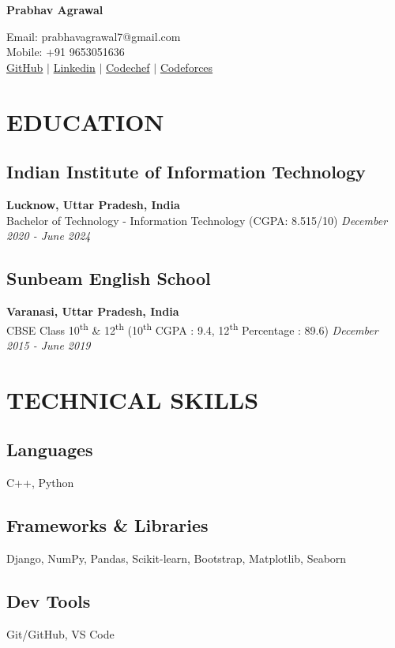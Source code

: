\documentclass[12pt]{article}
\newcommand{\resumename}[1]{\LARGE\textbf{#1} \hfill \small}
\begin{document}
\noindent
\resumename{Prabhav Agrawal} \raggedright Email: prabhavagrawal7@gmail.com \\
\hfill Mobile: +91 9653051636 \\
\href{https://github.com/prabhavagrawal7}{GitHub} $\vert$
\href{https://www.linkedin.com/in/prabhavagrawal7/}{Linkedin} $\vert$
\href{https://www.codechef.com/users/prabhav7}{Codechef} $\vert$
\href{https://codeforces.com/profile/prabhavagrawal7}{Codeforces} 
\section*{EDUCATION}
\subsection*{Indian Institute of Information Technology}      \hfill \textbf{Lucknow, Uttar Pradesh, India} \\
Bachelor of Technology - Information Technology (CGPA: 8.515/10) \hfill \textit{December 2020 - June 2024} \\
\subsection*{Sunbeam English School}                       \hfill \textbf{Varanasi, Uttar Pradesh, India} \\
CBSE Class 10\textsuperscript{th} \& 12\textsuperscript{th} (10\textsuperscript{th} CGPA : 9.4, 12\textsuperscript{th} Percentage : 89.6) \hfill \textit{December 2015 - June 2019} \\ 
\section*{TECHNICAL SKILLS}
\subsection*{Languages}               \hspace*{4.4cm} C++, Python \\
\subsection*{Frameworks \& Libraries} \hspace*{1.74cm} Django, NumPy, Pandas, Scikit-learn, Bootstrap, Matplotlib, Seaborn\\
\subsection*{Dev Tools}               \hspace*{4.45cm} Git/GitHub, VS Code \\ 
\end{document}
